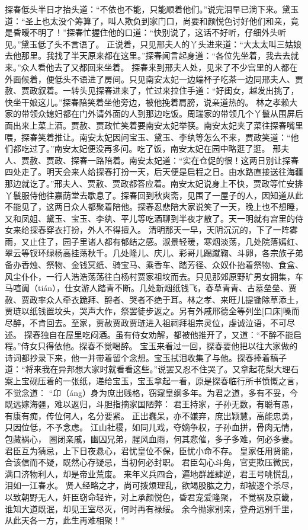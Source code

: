 \documentclass[12pt,oneside]{book}
\begin{document}
探春低头半日才抬头道：“不依也不能，只能顺着他们。”说完泪早已淌下来。黛玉道：“圣上也太没个筹算了，叫人欺负到家门口，尚要和颜悦色讨好他们和亲，竟是昏暧不明了！”探春忙握住他的口道：“快别说了，这话不好听，仔细外头听见。”黛玉低了头不言语了。
正说着，只见邢夫人的丫头进来道：“大太太叫三姑娘去他那里。我找了半天原来都在这里。”探春闻言起身道：“各位先坐着，我去去就来。”众人看他去了又都回来坐着。
探春来到邢夫人处，见来了不少宫里的人都在外面候着，便低头不语进了房间。只见南安太妃一边端杯子吃茶一边同邢夫人、贾赦、贾政叙着。一转头见探春进来了，忙过来拉住手道：“好闺女，越发出挑了，快坐干娘这儿。”探春陪笑着坐他旁边，被他挽着肩膀，说亲道热的。
林之孝赖大家的带领众媳妇都在门外请外面的人到那边吃饭。周瑞家的带领几个丫鬟从围屏后面出来上菜上酒。贾赦、贾政忙笑着要南安太妃举筷。南安太妃夹了菜往探春嘴里喂，探春笑着推让。南安太妃因问宝玉、黛玉、李纨等怎么不来，贾政笑道：“他们都吃过了。”南安太妃便没再多问。吃了饭，南安太妃在园中略逛了逛。
邢夫人、贾赦、贾政、探春一路陪着。南安太妃道：“实在仓促的很！这两日别让探春四处走了。明天会来人给探春打扮一天，后天便是启程之日。由水路直接送往海疆那边就讫了。”邢夫人、贾赦、贾政都答应着。南安太妃说身上不快，贾政等忙安排丫鬟服侍他往嘉荫堂去歇息了。探春回到秋爽斋，见围了一屋子的人，因知道从此不能见了，这两日众人都聚着陪他。探春忍悲陪大家说笑了一天，晚上也不想睡，又和凤姐、黛玉、宝玉、李纨、平儿等吃酒聊到半夜才散了。天一明就有宫里的侍女来给探春穿衣打扮，外人不得擅入。
清明那天一早，天阴沉沉的，下了一阵雾雨，又止住了，园子里诸人都有郁结之感。淑景轻暖，寒烟淡荡，几处院落嫣红、翠云等钗环绿杨高挂荡秋千。几处隆儿、庆儿、彩哥儿踢蹴鞠、斗卵，各宗族子弟备办香烛、祭物、金钱冥纸、骑宝马、乘香车、踏芳径、众奴仆抬着祭物、食盒、风尘仆仆，一行人浩浩荡荡往白杨村贾家祖坟而去。只见那郊原野旷男女拥集，车马喧阗（tián），仕女游人踏青不断。几处新烟纸钱飞，春草青青、古墓垒垒、贾赦、贾政率众人牵衣跪拜、酹者、哭者不绝于耳。林之孝、来旺儿提锄除草添土，贾琏以纸钱置坟头，哭声大作，祭罢徒步返之。另有外戚邢德全等列坐[口床]嗓而尽醉，不肯回去。至家，贾赦贾政贾琏进入祖祠拜祖宗灵位，虔诚泣语，不可尽述。
探春独自在屋里吃闷酒。虽有侍女劝解，都被他推开了，又道：“不醉不能启程。”侍女只得依他。探春不觉喝醉。
宝玉来看过一回，探春要他把以往大家做的诗词都抄录下来，他一并带着留个念想。宝玉拭泪收集了与他。探春捧着稿子道：“将来我在异邦想大家时就看看这些。”说罢又忍不住哭了。又拿起花梨大理石案上宝砚压着的一张纸，递给宝玉，宝玉拿起一看，原是探春临行所书愤慨之言，不觉念道：
“卬（áng）身为庶出贱格，窃窥皇纲多年。为君之道，多有不妥，今既远嫁海疆，难以返归，斗胆指摘家国陋弊：
君王持家，子孙无数，有聪有愚，有康有痴，传位何人，名分要紧。
正出蠢呆，亦不嫌弃，庶出颖慧，高能忠勇，只因位低，不予念虑。
江山社稷，如同儿戏，夺嫡争权，子孙血拼，骨肉无情，包藏祸心，
圈闭亲戚，幽囚兄弟，腥风血雨，何其悲催，多子多难，何必多妻。
君臣互为猜忌，上下日夜悬心，君忧皇位不保，臣忧小命不存。
皇家任用贤能，合该信而不疑，既然心存疑忌，当初何必封职。
君臣勾心斗角，官吏欺压微民，满口济物利人，却是帝业荒废。
来年义兵四合，遍地群雄肆逆，君王号咷慌乱，泪如一江春水。
贤人经略之才，尚可拨烦理乱，欲竭股肱之力，却被逐个杀尽，
以致朝野无人，奸臣窃命轻许，对上承颜悦色，昏君宠爱隆聚，
不觉祸及京畿，谁知大道既泯，却见王室尽灭，何时再有禄绥。
余今抛家别亲，登舟远别千里，从此天各一方，此生再难相聚！”
\end{document}
